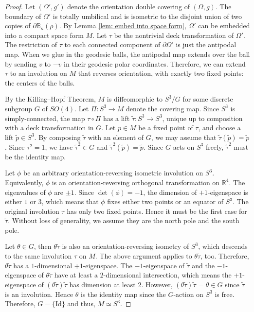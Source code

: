 \documentclass[11pt]{amsart}
\newcommand*{\Id}{\mathrm{Id}}
\theoremstyle{definition}
\numberwithin{equation}{section}
\begin{document}
\begin{proof}
    Let $(\Omega', g')$ denote the orientation double covering of $(\Omega,g)$. The boundary of $\Omega'$ is totally umbilical and is isometric to the disjoint union of two copies of $\partial\mathbb B_\kappa(\rho)$. By Lemma \ref{lem: embed into space form}, $\Omega'$ can be embedded into a compact space form $M$. Let $\tau$ be the nontrivial deck transformation of $\Omega'$. The restriction of $\tau$ to each connected component of $\partial \Omega'$ is just the antipodal map. When we glue in the geodesic balls, the antipodal map extends over the ball by sending $v$ to $-v$ in their geodesic polar coordinates. Therefore, we can extend $\tau$ to an involution on $M$ that reverses orientation, with exactly two fixed points: the centers of the balls. 

    By the Killing--Hopf Theorem, $M$ is diffeomorphic to $S^3/G$ for some discrete subgroup $G$ of $SO(4)$. Let $\Pi:S^3\to M$ denote the covering map. Since $S^3$ is simply-connected, the map $\tau\circ\Pi$ has a lift $\tilde\tau: S^3\to S^3$,  unique up to composition with a deck transformation in $G$. Let $p\in M$ be a fixed point of $\tau$, and choose a lift $\tilde p\in S^3$. By composing $\tilde\tau$ with an element of $G$, we may assume that $\tilde\tau(\tilde p) = \tilde p$. Since $\tau^2 = 1$, we have $\tilde\tau^2\in G$ and $\tilde\tau^2(\tilde p) = \tilde p$. Since $G$ acts on $S^3$ freely, $\tilde\tau^2$ must be the identity map. 

    Let $\phi$ be an arbitrary orientation-reversing isometric involution on $S^3$. Equivalently, $\phi$ is an orientation-reversing orthogonal transformation on $\mathbb R^4$. The eigenvalues of $\phi$ are $\pm 1$. Since $\det(\phi) = -1$, the dimension of $+1$-eigenspace is either $1$ or $3$, which means that $\phi$ fixes either two points or an equator of $S^3$. The original involution $\tau$ has only two fixed points. Hence it must be the first case for $\tilde\tau$. Without loss of generality, we assume they are the north pole and the south pole.

    Let $\theta\in G$, then $\theta\tilde\tau$ is also an orientation-reversing isometry of $S^3$, which descends to the same involution $\tau$ on $M$. The above argument applies to $\theta\tilde\tau$, too. Therefore, $\theta\tilde\tau$ has a $1$-dimensional $+1$-eigenspace. The $-1$-eigenspace of $\tilde\tau$ and the $-1$-eigenspace of $\theta\tilde\tau$ have at least a $2$-dimensional intersection, which means the $+1$-eigenspace of $(\theta\tilde\tau)\tilde\tau$ has dimension at least $2$. However, $(\theta\tilde\tau)\tilde\tau$ = $\theta\in G$ since $\tilde\tau$ is an involution. Hence $\theta$ is the identity map since the $G$-action on $S^3$ is free. Therefore, $G = \{\Id\}$ and thus, $M \simeq S^3$.
 


\end{proof}
\end{document}
